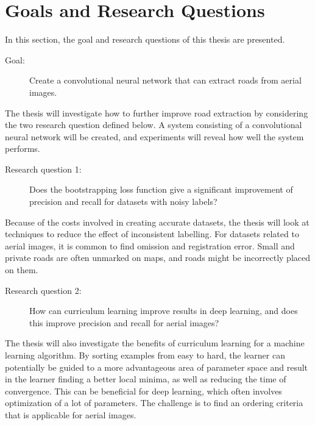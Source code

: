 \section{Goals and Research Questions}
\label{sec:Goals and Research Questions}
In this section, the goal and research questions of this thesis are presented. 

\begin{description}
\item[Goal:] Create a convolutional neural network that can extract roads from aerial images.
\end{description}

The thesis will investigate how to further improve road extraction by considering the two research question defined below. A system consisting of a convolutional neural network will be created, and experiments will reveal how well the system performs.

\begin{description}
\item[Research question 1:] Does the bootstrapping loss function give a significant improvement of precision and recall for datasets with noisy labels?
\end{description}

Because of the costs involved in creating accurate datasets, the thesis will look at techniques to reduce the effect of inconsistent labelling. For datasets related to aerial images, it is common to find omission and registration error. Small and private roads are often unmarked on maps, and roads might be incorrectly placed on them.


\begin{description}
\item[Research question 2:]  How can curriculum learning improve results in deep learning, and does this improve precision and recall for aerial images?
\end{description}

The thesis will also investigate the benefits of curriculum learning for a machine learning algorithm. By sorting examples from easy to hard, the learner can potentially be guided to a more advantageous area of parameter space and result in the learner finding a better local minima, as well as reducing the time of convergence. This can be beneficial for deep learning, which often involves optimization of a lot of parameters. The challenge is to find an ordering criteria that is applicable for aerial images. 

